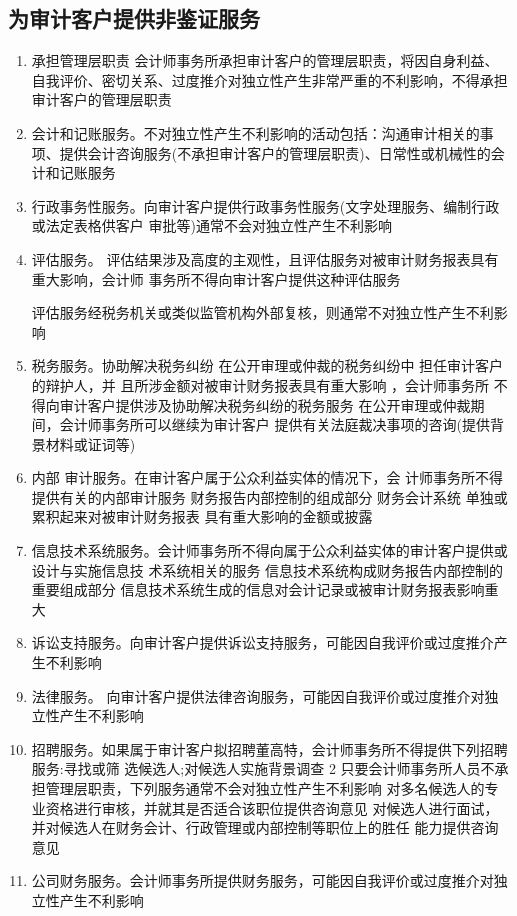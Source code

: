 \documentclass[UTF8,12pt]{ctexart}
\numberwithin{equation}{section} %
\numberwithin{figure}{section}
\numberwithin{table}{section}
\begin{document}
	\subsection{为审计客户提供非鉴证服务}
	\begin{enumerate}
		\item 承担管理层职责 会计师事务所承担审计客户的管理层职责，将因自身利益、自我评价、密切关系、过度推介对独立性产生非常严重的不利影响，不得承担审计客户的管理层职责
		
		\item 会计和记账服务。不对独立性产生不利影响的活动包括：沟通审计相关的事项、提供会计咨询服务(不承担审计客户的管理层职责)、日常性或机械性的会计和记账服务
		
		\item 行政事务性服务。向审计客户提供行政事务性服务(文字处理服务、编制行政或法定表格供客户 审批等)通常不会对独立性产生不利影响
		
		\item 评估服务。
		评估结果涉及高度的主观性，且评估服务对被审计财务报表具有重大影响，会计师 事务所不得向审计客户提供这种评估服务 
		
		评估服务经税务机关或类似监管机构外部复核，则通常不对独立性产生不利影响
		
		\item 税务服务。协助解决税务纠纷
		在公开审理或仲裁的税务纠纷中  担任审计客户的辩护人，并 且所涉金额对被审计财务报表具有重大影响  ，会计师事务所 不得向审计客户提供涉及协助解决税务纠纷的税务服务 在公开审理或仲裁期间，会计师事务所可以继续为审计客户 提供有关法庭裁决事项的咨询(提供背景材料或证词等)
		
		\item 内部 审计服务。在审计客户属于公众利益实体的情况下，会 计师事务所不得提供有关的内部审计服务
		财务报告内部控制的组成部分 财务会计系统 单独或累积起来对被审计财务报表 具有重大影响的金额或披露
		
		\item 信息技术系统服务。会计师事务所不得向属于公众利益实体的审计客户提供或设计与实施信息技
		术系统相关的服务
		信息技术系统构成财务报告内部控制的重要组成部分
		信息技术系统生成的信息对会计记录或被审计财务报表影响重大
		
		\item 诉讼支持服务。向审计客户提供诉讼支持服务，可能因自我评价或过度推介产生不利影响
		
		\item 法律服务。 向审计客户提供法律咨询服务，可能因自我评价或过度推介对独立性产生不利影响
		
		\item 招聘服务。如果属于审计客户拟招聘董高特，会计师事务所不得提供下列招聘服务:寻找或筛 选候选人;对候选人实施背景调查
		2 只要会计师事务所人员不承担管理层职责，下列服务通常不会对独立性产生不利影响 对多名候选人的专业资格进行审核，并就其是否适合该职位提供咨询意见 对候选人进行面试，并对候选人在财务会计、行政管理或内部控制等职位上的胜任 能力提供咨询意见
		
		\item 公司财务服务。会计师事务所提供财务服务，可能因自我评价或过度推介对独立性产生不利影响
	\end{enumerate}
	
\end{document}
